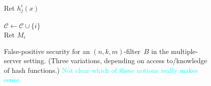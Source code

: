 \begin{figure}
{{\medskip
{}\\
Ret $h^i_j(x)$\\

\medskip
{}\\
$\mathcal{C} \gets \mathcal{C} \cup \{i\}$\\
Ret $M_i$\\
}
}
\caption{False-positive security for an $(n,k,m)$-filter~$B$ in the multiple-server setting.  (Three variations, depending on access to/knowledge of hash functions.) \textcolor{cyan}{Not clear which of these notions really makes sense.}}
\label{fig:fp-filter}
\end{figure}
